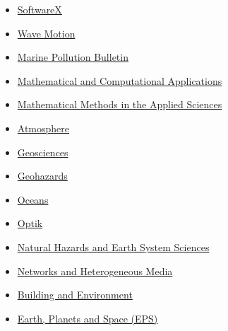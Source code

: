 \begin{itemize}
    \item[$\blacktriangleright$] \href{https://www.sciencedirect.com/journal/softwarex/}%
    {SoftwareX}
  
    \item[$\blacktriangleright$] \href{http://www.elsevier.com/locate/wavemoti}%
    {Wave Motion}

    \item \href{https://www.sciencedirect.com/journal/marine-pollution-bulletin/}%
    {Marine Pollution Bulletin}
    
    \item[$\blacktriangleright$] \href{https://www.mdpi.com/journal/mca}%
    {Mathematical and Computational Applications}
    
    \item[$\blacktriangleright$] \href{https://onlinelibrary.wiley.com/journal/10991476/}%
    {Mathematical Methods in the Applied Sciences}

    \item[$\blacktriangleright$] \href{https://www.mdpi.com/journal/atmosphere/}%
    {Atmosphere}
    
    \item[$\blacktriangleright$] \href{https://www.mdpi.com/journal/geosciences/}%
    {Geosciences}

    \item[$\blacktriangleright$] \href{https://www.mdpi.com/journal/geohazards/}%
    {Geohazards}

    \item[$\blacktriangleright$] \href{https://www.mdpi.com/journal/oceans/}%
    {Oceans}
    
    \item[$\blacktriangleright$] \href{https://www.sciencedirect.com/journal/optik/}%
    {Optik}
    
    \item[$\blacktriangleright$] \href{http://www.nat-hazards-earth-syst-sci.net/}%
    {Natural Hazards and Earth System Sciences}

    \item[$\blacktriangleright$] \href{https://www.aimspress.com/journal/nhm/}%
    {Networks and Heterogeneous Media}
    
    \item[$\blacktriangleright$] \href{https://www.sciencedirect.com/journal/building-and-environment}%
    {Building and Environment}
    
    \item[$\blacktriangleright$] \href{http://www.terrapub.co.jp/journals/EPS/}%
    {Earth, Planets and Space (EPS)}
    

\end{itemize}
